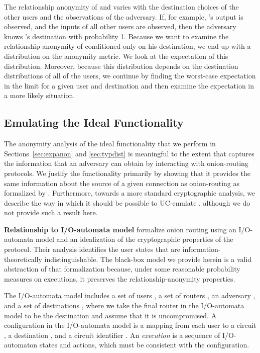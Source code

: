 \documentclass[prodmode,acmtissec]{acmsmall}
\begin{document}
The relationship anonymity of  and  varies with the destination
choices of the other users and the observations of the adversary.  If,
for example, 's output is observed, and the inputs of all other
users are observed, then the adversary knows 's destination with
probability 1.  Because we want to examine the relationship anonymity
of  conditioned only on his destination, we end up with a
distribution on the anonymity metric.  We look at the expectation of
this distribution.  Moreover, because this distribution depends on the
destination distributions of all of the users, we continue by finding
the worst-case expectation in the limit for a given user and
destination and then examine the expectation in a more likely
situation.


\subsection{Emulating the Ideal Functionality} \label{subsec:fc2uc}
The anonymity analysis of the ideal functionality  that we perform in Sections~\ref{sec:expanon} and \ref{sec:typdist} is meaningful to the extent that  captures the information that an adversary can obtain by interacting with onion-routing protocols. We justify the functionality primarily by showing that it provides the same information about the source of a given connection as onion-routing as formalized by . Furthermore, towards a more standard cryptographic analysis, we describe the way in which it should be possible to UC-emulate , although we do not provide such a result here.

{\bf Relationship to I/O-automata model}
 formalize onion routing using an I/O-automata model\cite{LYNCH} and an idealization of the cryptographic properties of the protocol. Their analysis identifies the user states that are information-theoretically indistinguishable. The black-box model we provide herein is a valid abstraction of that formalization because, under some reasonable probability measures on executions, it preserves the relationship-anonymity properties.

The I/O-automata model includes a set of users , a set of routers , an adversary , and a set of destinations , where we take the final router in the I/O-automata model to be the destination and assume that it is uncompromised.  A configuration  in the I/O-automata model is a mapping from each user  to a circuit , a destination , and a circuit identifier .  An \emph{execution} is a sequence of I/O-automaton states and actions, which must be consistent with the configuration.
\end{document}
